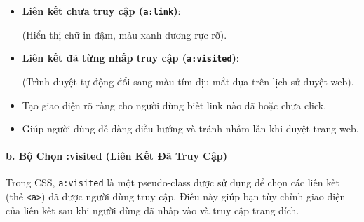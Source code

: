 \documentclass[11pt,oneside]{book}
\newcommand{\codeinline}[1]{\textcolor{accentOrange}{\texttt{#1}}}
\begin{document}
\begin{browserWindow}
\sffamily\small
\begin{itemize}[leftmargin=1.5em, itemsep=3pt, parsep=0pt]
    \item \textbf{Liên kết chưa truy cập (\codeinline{a:link})}:
    \par\vspace{2pt}
    \quad (Hiển thị chữ in đậm, màu xanh dương rực rỡ).
    \par\vspace{4pt}
    \item \textbf{Liên kết đã từng nhấp truy cập (\codeinline{a:visited})}:
    \par\vspace{2pt}
    \quad (Trình duyệt tự động đổi sang màu tím dịu mắt dựa trên lịch sử duyệt web).
\end{itemize}
\end{browserWindow}

\begin{tipBox}
\begin{itemize}[leftmargin=1.5em, itemsep=2pt, parsep=0pt]
    \item Tạo giao diện rõ ràng cho người dùng biết link nào đã hoặc chưa click.
    \item Giúp người dùng dễ dàng điều hướng và tránh nhầm lẫn khi duyệt trang web.
\end{itemize}
\end{tipBox}

\paragraph{b. Bộ Chọn :visited (Liên Kết Đã Truy Cập)}

Trong CSS, \codeinline{a:visited} là một pseudo-class được sử dụng để chọn các liên kết (thẻ \codeinline{<a>}) đã được người dùng truy cập. Điều này giúp bạn tùy chỉnh giao diện của liên kết sau khi người dùng đã nhấp vào và truy cập trang đích.
\end{document}

